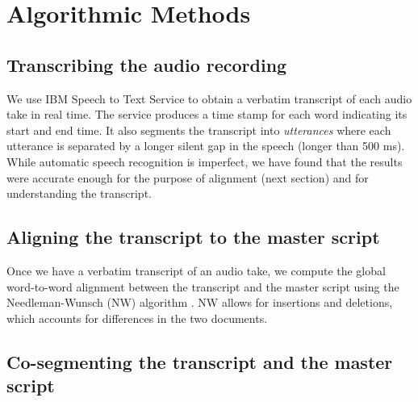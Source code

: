 \section{Algorithmic Methods}
\label{sec:algorithms}
\subsection{Transcribing the audio recording}
We use IBM Speech to Text Service \cite{ibmspeechtotext} to obtain a verbatim transcript of each audio take in real time. The service produces a time stamp for each word indicating its start and end time. It also segments the transcript into \textit{utterances} where each utterance is separated by a longer silent gap in the speech (longer than 500 ms). While automatic speech recognition is imperfect, we have found that the results were accurate enough for the purpose of alignment (next section) and for understanding the transcript.
  
\subsection{Aligning the transcript to the master script}
Once we have a verbatim transcript of an audio take, we compute the global word-to-word alignment between the transcript and the master script using the Needleman-Wunsch (NW) algorithm \cite{needleman1970general}. NW allows for insertions and deletions, which accounts for differences in the two documents. 

\subsection{Co-segmenting the transcript and the master script}

